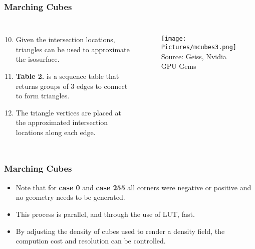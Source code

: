 \documentclass[12pt]{beamer}
\begin{document}

        \begin{frame}
            \frametitle{Marching Cubes}
            \begin{columns}[c] %

                \begin{enumerate}
                    \setcounter{enumi}{9}
                \item Given the intersection locations, triangles can be used to approximate the isosurface.
                \item \textbf{Table 2.} is a sequence table that returns groups of 3 edges to connect to form triangles.
               \item The triangle vertices are placed at the approximated intersection locations along each edge.
               \end{enumerate}

                \begin{figure}
                    \texttt{[image: Pictures/mcubes3.png]}\\
                    \tiny{Source: Geiss, Nvidia GPU Gems}

                \end{figure}

            \end{columns}
        \end{frame}
        \begin{frame}
            \frametitle{Marching Cubes}
            \begin{itemize}
                \item Note that for \textbf{case 0} and \textbf{case 255} all corners were negative or positive and no geometry needs to be generated.
                 \item This process is parallel, and through the use of LUT, fast.
                 \item By adjusting the density of cubes used to render a density field, the compution cost and resolution can be controlled.
                 
            \end{itemize}

        \end{frame}
\end{document}
